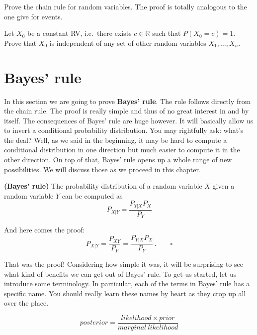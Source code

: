 \begin{Exercise}
Prove the chain rule for random variables. The proof is totally analogous to the one give for events.
\end{Exercise}

\begin{Exercise}
Let $X_0$ be a constant RV, i.e.\ there exists $c \in \mathbb{R}$ such that $P(X_0 = c)=1$. 
Prove that $X_0$ is independent of any set of other random variables $X_1,\ldots,X_n$.
\end{Exercise}

\section{Bayes' rule}

In this section we are going to prove \textbf{Bayes' rule}. The rule follows directly from the chain rule.
The proof is really simple and thus of no great interest in and by itself. The consequences of Bayes' rule
are huge however. It will basically allow us to invert a conditional probability distribution. You may rightfully
ask: what's the deal? Well, as we said in the beginning, it may be hard to compute a conditional distribution in one
direction but much easier to compute it in the other direction. On top of that, Bayes' rule opens up a whole range of new possibilities. We will discuss those as we proceed in this chapter.
\begin{Theorem}{\textbf{(Bayes' rule)}}
The probability distribution of a random variable $ X $ given a random variable $ Y $ can be computed as
$$ P_{X|Y} = \dfrac{P_{Y|X}P_{X}}{P_{Y}} $$
\end{Theorem}

And here comes the proof:
\begin{equation}
P_{X|Y} = \dfrac{P_{XY}}{P_{Y}} = \dfrac{P_{Y|X}P_{X}}{P_{Y}} \, . \qquad  \square
\end{equation}

That was the proof! Considering how simple it was, it will be surprising to see what kind of benefits we can get out
of Bayes' rule. To get us started, let us introduce some terminology. In particular, each of the terms
in Bayes' rule has a specific name. You should really learn these names by heart as they crop up all over the place.

$$ \mathit{posterior} = \dfrac{\mathit{likelihood} \times \mathit{prior}}{\mathit{marginal~likelihood}} $$

